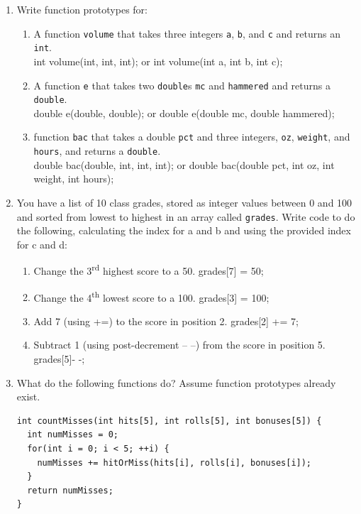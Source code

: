 \documentclass[letter,11pt]{article}
\begin{document}
\begin{enumerate}
    \item Write function prototypes for:
    \begin{enumerate}
        \item A function \texttt{volume} that takes three integers \texttt{a}, \texttt{b}, and \texttt{c} and returns an \texttt{int}. \\
        {\color{red}int volume(int, int, int);} or {\color{red}int volume(int a, int b, int c);}
        \item A function \texttt{e} that takes two \texttt{double}s \texttt{mc} and \texttt{hammered} and returns a \texttt{double}. \\
        {\color{red}double e(double, double);} or {\color{red}double e(double mc, double hammered);}
        \item function \texttt{bac} that takes a double \texttt{pct} and three integers, \texttt{oz}, \texttt{weight}, and \texttt{hours}, and returns a \texttt{double}. \\
        {\color{red}double bac(double, int, int, int);} or {\color{red}double bac(double pct, int oz, int weight, int hours);}
    \end{enumerate}
    
    \item You have a list of 10 class grades, stored as integer values between 0 and 100 and sorted from lowest to highest in an array called \texttt{grades}. Write code to do the following, calculating the index for a and b and using the provided index for c and d:
    \begin{enumerate}
        \item Change the 3\textsuperscript{rd} highest score to a 50. {\color{red}grades[7] = 50;}
        \item Change the 4\textsuperscript{th} lowest score to a 100. {\color{red}grades[3] = 100;}
        \item Add 7 (using +=) to the score in position 2. {\color{red}grades[2] += 7;}
        \item Subtract 1 (using post-decrement -- --) from the score in position 5. {\color{red}grades[5]- -;}
    \end{enumerate}
    
    \item What do the following functions do? Assume function prototypes already exist.
    \begin{verbatim}
int countMisses(int hits[5], int rolls[5], int bonuses[5]) {
  int numMisses = 0;
  for(int i = 0; i < 5; ++i) {
    numMisses += hitOrMiss(hits[i], rolls[i], bonuses[i]);
  }
  return numMisses;
}


\end{verbatim}
\end{enumerate}
\end{document}

